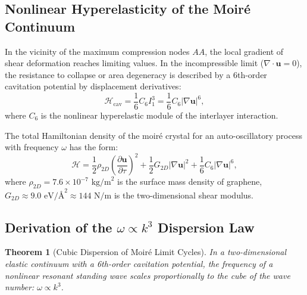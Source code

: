 \documentclass[12pt,a4paper]{article}
\newtheorem{theorem}{Theorem}
\begin{document}
	\subsection{Nonlinear Hyperelasticity of the Moiré Continuum}
	In the vicinity of the maximum compression nodes $AA$, the local gradient of shear deformation reaches limiting values. In the incompressible limit ($\nabla \cdot \mathbf{u} = 0$), the resistance to collapse or area degeneracy is described by a 6th-order cavitation potential by displacement derivatives:
	\begin{equation}
		\mathcal{H}_{\text{cav}} = \frac{1}{6} C_6 I_1^3 = \frac{1}{6} C_6 |\nabla \mathbf{u}|^6,
	\end{equation}
	where $C_6$ is the nonlinear hyperelastic module of the interlayer interaction.
	
	The total Hamiltonian density of the moiré crystal for an auto-oscillatory process with frequency $\omega$ has the form:
	\begin{equation}
		\mathcal{H} = \frac{1}{2} \rho_{2D} \left( \frac{\partial \mathbf{u}}{\partial \tau} \right)^2 + \frac{1}{2} G_{2D} |\nabla \mathbf{u}|^2 + \frac{1}{6} C_6 |\nabla \mathbf{u}|^6,
	\end{equation}
	where $\rho_{2D} = 7.6 \times 10^{-7}\text{ kg/m}^2$ is the surface mass density of graphene, $G_{2D} \approx 9.0\text{ eV/\AA}^2 \approx 144\text{ N/m}$ is the two-dimensional shear modulus.
	
	\subsection{Derivation of the $\omega \propto k^3$ Dispersion Law}
	\begin{theorem}[Cubic Dispersion of Moiré Limit Cycles]
		In a two-dimensional elastic continuum with a 6th-order cavitation potential, the frequency of a nonlinear resonant standing wave scales proportionally to the cube of the wave number: $\omega \propto k^3$.
	\end{theorem}
	
\end{document}
